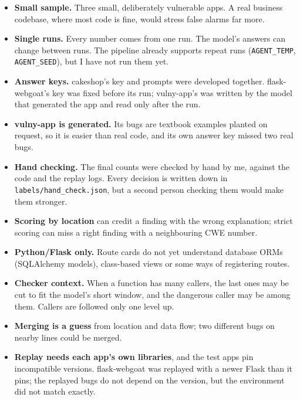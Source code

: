 \documentclass[11pt,a4paper]{article}
\newcommand{\code}[1]{\texttt{#1}}
\begin{document}
\begin{itemize}
  \item \textbf{Small sample.} Three small, deliberately vulnerable apps. A real business codebase, where most code
        is fine, would stress false alarms far more.
  \item \textbf{Single runs.} Every number comes from one run. The model's answers can change between runs. The
        pipeline already supports repeat runs (\code{AGENT\_TEMP}, \code{AGENT\_SEED}), but I have not run them yet.
  \item \textbf{Answer keys.} cakeshop's key and prompts were developed together. flask-webgoat's key was fixed
        before its run; vulny-app's was written by the model that generated the app and read only after the run.
  \item \textbf{vulny-app is generated.} Its bugs are textbook examples planted on request, so it is easier than real
        code, and its own answer key missed two real bugs.
  \item \textbf{Hand checking.} The final counts were checked by hand by me, against the code and the replay logs.
        Every decision is written down in \code{labels/hand\_check.json}, but a second person checking them would
        make them stronger.
  \item \textbf{Scoring by location} can credit a finding with the wrong explanation; strict scoring can miss a right
        finding with a neighbouring CWE number.
  \item \textbf{Python/Flask only.} Route cards do not yet understand database ORMs (SQLAlchemy models), class-based
        views or some ways of registering routes.
  \item \textbf{Checker context.} When a function has many callers, the last ones may be cut to fit the model's short
        window, and the dangerous caller may be among them. Callers are followed only one level up.
  \item \textbf{Merging is a guess} from location and data flow; two different bugs on nearby lines could be merged.
  \item \textbf{Replay needs each app's own libraries}, and the test apps pin incompatible versions. flask-webgoat was
        replayed with a newer Flask than it pins; the replayed bugs do not depend on the version, but the environment
        did not match exactly.
\end{itemize}

\end{document}
